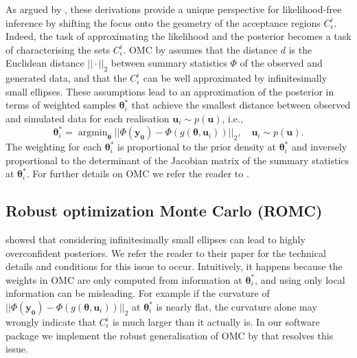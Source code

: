\documentclass[article]{jss}
\newcommand{\ub}{\mathbf{u}}
\newcommand{\thetab}{\boldsymbol{\theta}}
\newcommand{\simulator}{g}
\newcommand{\data}{\mathbf{y_0}}
\newcommand{\accregioni}{C^i_{\epsilon}}
\DeclareMathOperator*{\argmin}{argmin}
\begin{document}
As argued by \citet{Ikonomov2019}, these derivations provide a unique
perspective for likelihood-free inference by shifting the focus onto
the geometry of the acceptance regions \(\accregioni\). Indeed, the
task of approximating the likelihood and the posterior becomes a task
of characterising the sets \(\accregioni\). OMC by \citet{Meeds2015}
assumes that the distance \(d\) is the Euclidean distance
\(||\cdot||_2\) between summary statistics \(\Phi\) of the observed
and generated data, and that the \(\accregioni\) can be well
approximated by infinitesimally small ellipses. These assumptions lead
to an approximation of the posterior in terms of weighted samples
\(\thetab_i^*\) that achieve the smallest distance between observed
and simulated data for each realisation \(\ub_i \sim p(\ub)\), i.e.,\
\begin{equation} \label{eq:omc_opt_prob}
\thetab_i^* = \argmin_{\thetab} ||\Phi(\data)-\Phi(\simulator(\thetab, \ub_i))||_2  , \quad \ub_i \sim p(\ub).
\end{equation}
The weighting for each \(\thetab_i^*\) is proportional to the prior
density at \(\thetab_i^*\) and inversely proportional to the determinant
of the Jacobian matrix of the summary statistics at \(\thetab_i^*\). For
further details on OMC we refer the reader to \citep{Meeds2015,
  Ikonomov2019}.



\subsection{Robust optimization Monte Carlo (ROMC)}

\citet{Ikonomov2019} showed that considering infinitesimally small
ellipses can lead to highly overconfident posteriors. We refer the
reader to their paper for the technical details and conditions for
this issue to occur. Intuitively, it happens because the weights in
OMC are only computed from information at \(\thetab_i^*\), and using
only local information can be misleading. For example if the curvature
of \(||\Phi(\data)-\Phi(\simulator(\thetab, \ub_i))||_2\) at
\(\thetab_i^*\) is nearly flat, the curvature alone may wrongly
indicate that \(\accregioni\) is much larger than it actually is. In
our software package we implement the robust generalisation of OMC by
\citet{Ikonomov2019} that resolves this issue.
\end{document}
